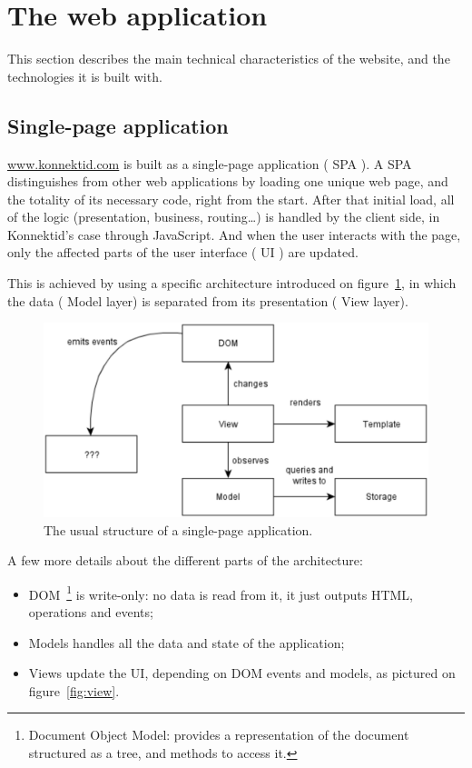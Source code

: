 \section{The web application}
\label{sec:website}

This section describes the main technical characteristics of the website, and the technologies it is built with.

\subsection{Single-page application}
\label{ssec:spa}

\url{www.konnektid.com} is built as a single-page application (\guillemotleft{} SPA \guillemotright{}).
A SPA distinguishes from other web applications by loading one unique web page, and the totality of its necessary code, right from the start.
After that initial load, all of the logic (presentation, business, routing\ldots) is handled by the client side, in Konnektid's case through JavaScript.
And when the user interacts with the page, only the affected parts of the user interface (\guillemotleft{} UI \guillemotright{}) are updated.

This is achieved by using a specific architecture introduced on {\sc figure}~\ref{fig:spaArchi}, in which the data (\guillemotleft{} Model
\guillemotright{} layer) is separated from its presentation (\guillemotleft{} View \guillemotright{} layer)\cite{spa}.

\begin{figure}[H]
    \centering
    \includegraphics[scale=0.6]{figure/spaArchi.png}
    \caption{The usual structure of a single-page application.}
    \label{fig:spaArchi}
\end{figure}

A few more details about the different parts of the architecture:
\begin{itemize}[noitemsep]
    \item DOM~\footnote{Document Object Model: provides a representation of the document structured as a tree, and methods to access it.} is write-only:
    no data is read from it, it just outputs HTML, operations and events;
    \item Models handles all the data and state of the application;
    \item Views update the UI, depending on DOM events and models, as pictured on {\sc figure}~\ref{fig:view}.
\end{itemize}

